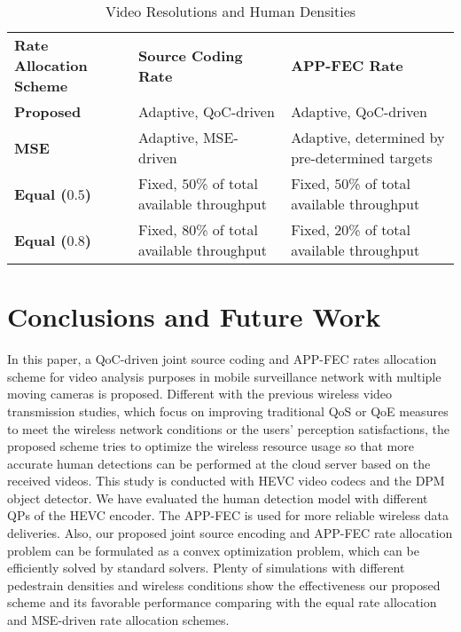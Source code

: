 \documentclass[journal]{IEEEtran}
\begin{document}
\begin{table}[t]
\renewcommand{\arraystretch}{1.3}
\caption{Video Resolutions and Human Densities}
\begin{center}
\begin{tabular}{|p{1.9cm}!{\vrule width 2pt}p{2.7cm}|p{2.7cm}|}
\hline
\textbf{Rate Allocation Scheme} & \textbf{Source Coding Rate} & \textbf{APP-FEC Rate} \\ 
\textbf{Proposed} & Adaptive, QoC-driven & Adaptive, QoC-driven \\ \hline
\textbf{MSE} & Adaptive, MSE-driven & Adaptive, determined by pre-determined targets \\ \hline 
\textbf{Equal ($0.5$)} & Fixed, $50$\% of total available throughput  & Fixed, $50$\% of total available throughput \\ \hline
\textbf{Equal ($0.8$)} &Fixed, $80$\% of total available throughput &Fixed, $20$\% of total available throughput \\
\hline
\end{tabular}
\end{center}
\label{Table: schemes}
\end{table}



\section{Conclusions and Future Work}
In this paper, a QoC-driven joint source coding and APP-FEC rates allocation scheme for video analysis purposes in mobile surveillance network with multiple moving cameras is proposed. Different with the previous wireless video transmission studies, which focus on improving traditional QoS or QoE measures to meet the wireless network conditions or the users' perception satisfactions, the proposed scheme tries to optimize the wireless resource usage so that more accurate human detections can be performed at the cloud server based on the received videos. This study is conducted with HEVC video codecs and the DPM object detector. We have evaluated the human detection model with different QPs of the HEVC encoder. The APP-FEC is used for more reliable wireless data deliveries. Also, our proposed joint source encoding and APP-FEC rate allocation problem can be formulated as a convex optimization problem, which can be efficiently solved by standard solvers. Plenty of simulations with different pedestrain densities and wireless conditions show the effectiveness our proposed scheme and its favorable performance comparing with the equal rate allocation and MSE-driven rate allocation schemes.
\end{document}
